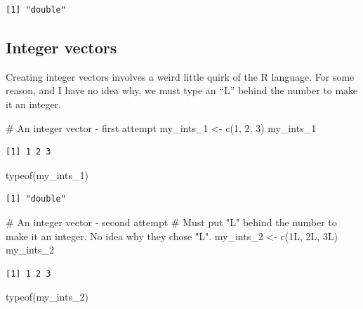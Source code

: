 \documentclass[
  letterpaper,
  DIV=11,
  numbers=noendperiod]{scrreprt}
\newenvironment{Shaded}{\begin{snugshade}}{\end{snugshade}}
\newcommand{\CommentTok}[1]{\textcolor[rgb]{0.37,0.37,0.37}{#1}}
\newcommand{\DecValTok}[1]{\textcolor[rgb]{0.68,0.00,0.00}{#1}}
\newcommand{\FunctionTok}[1]{\textcolor[rgb]{0.28,0.35,0.67}{#1}}
\newcommand{\NormalTok}[1]{\textcolor[rgb]{0.00,0.23,0.31}{#1}}
\newcommand{\OtherTok}[1]{\textcolor[rgb]{0.00,0.23,0.31}{#1}}
\begin{document}
\begin{verbatim}
[1] "double"
\end{verbatim}

\subsection{Integer vectors}\label{integer-vectors}

Creating integer vectors involves a weird little quirk of the R
language. For some reason, and I have no idea why, we must type an ``L''
behind the number to make it an integer.

\begin{Shaded}
\begin{Highlighting}[]
\CommentTok{\# An integer vector {-} first attempt}
\NormalTok{my\_ints\_1 }\OtherTok{\textless{}{-}} \FunctionTok{c}\NormalTok{(}\DecValTok{1}\NormalTok{, }\DecValTok{2}\NormalTok{, }\DecValTok{3}\NormalTok{)}
\NormalTok{my\_ints\_1}
\end{Highlighting}
\end{Shaded}

\begin{verbatim}
[1] 1 2 3
\end{verbatim}

\begin{Shaded}
\begin{Highlighting}[]
\FunctionTok{typeof}\NormalTok{(my\_ints\_1)}
\end{Highlighting}
\end{Shaded}

\begin{verbatim}
[1] "double"
\end{verbatim}

\begin{Shaded}
\begin{Highlighting}[]
\CommentTok{\# An integer vector {-} second attempt}
\CommentTok{\# Must put "L" behind the number to make it an integer. No idea why they chose "L".}
\NormalTok{my\_ints\_2 }\OtherTok{\textless{}{-}} \FunctionTok{c}\NormalTok{(}\DecValTok{1}\NormalTok{L, }\DecValTok{2}\NormalTok{L, }\DecValTok{3}\NormalTok{L)}
\NormalTok{my\_ints\_2}
\end{Highlighting}
\end{Shaded}

\begin{verbatim}
[1] 1 2 3
\end{verbatim}

\begin{Shaded}
\begin{Highlighting}[]
\FunctionTok{typeof}\NormalTok{(my\_ints\_2)}
\end{Highlighting}
\end{Shaded}
\end{document}
